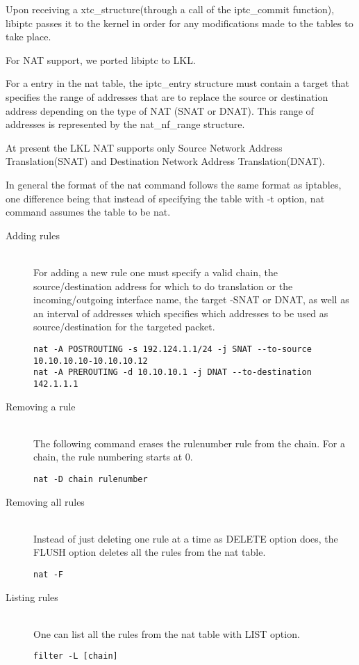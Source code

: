 {{\lstset{language=C, caption=TC_INIT}


Upon receiving a xtc_structure(through a call of the iptc_commit function), libiptc passes it to the kernel in order for any modifications made to the tables to take place.

For NAT support, we ported libiptc to LKL.

For a entry in the nat table, the iptc_entry structure must contain a target that specifies the range of addresses that are to replace the source or destination address depending on the type of NAT (SNAT or DNAT). This range of addresses is represented by the nat_nf_range structure.

\lstset{language=C, caption=struct nat_nf_range}


At present the LKL NAT supports only  Source Network Address Translation(SNAT) and  Destination Network Address Translation(DNAT).

In general the format of the nat command follows the same format as iptables, one difference being that instead of specifying the table with -t option, nat command assumes the table to be nat. 
\begin{description}
\item [Adding rules] \hfill \\
For adding a new rule one must specify a valid chain, the source/destination address for which to do translation or the incoming/outgoing interface name, the target -SNAT or DNAT, as well as an interval of addresses which specifies which addresses to be used as source/destination for the targeted packet.
\lstset{language=TeX,caption=Adding a rule,label=lst:saddrule}
\begin{lstlisting}
nat -A POSTROUTING -s 192.124.1.1/24 -j SNAT --to-source 10.10.10.10-10.10.10.12
nat -A PREROUTING -d 10.10.10.1 -j DNAT --to-destination 142.1.1.1
\end{lstlisting}
\item[Removing a rule] \hfill \\
The following command erases the rulenumber rule from the chain. For a chain, the rule numbering starts at 0.
\lstset{language=TeX,caption=Deleting a rule,label=lst:sdelrule}
\begin{lstlisting}
nat -D chain rulenumber
\end{lstlisting}
\item[Removing all rules] \hfill \\
Instead of just deleting one rule at a time as DELETE option does, the FLUSH option deletes all the rules from the nat table.
\lstset{language=TeX,caption=Deleting all rules,label=lst:sdelallrules}
\begin{lstlisting}
nat -F
\end{lstlisting}
\item [Listing rules] \hfill \\
One can list all the rules from the nat table with LIST option.
\lstset{language=zsh,caption=List rules,label=lst:slstrule}
\begin{lstlisting}
filter -L [chain]
\end{lstlisting}
\end{description}

}}
